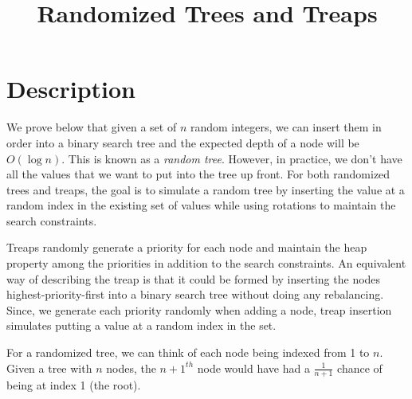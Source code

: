 \documentclass[12pt]{article}
\begin{document}
\title{Randomized Trees and Treaps}
\author{}
\maketitle


\section*{Description}
We prove below that given a set of $n$ random integers, we can insert them in order into a binary search tree and the expected depth of a node will be $O(\log n)$. This is known as a \emph{random tree}. However, in practice, we don't have all the values that we want to put into the tree up front. For both randomized trees and treaps, the goal is to simulate a random tree by inserting the value at a random index in the existing set of values while using rotations to maintain the search constraints.

Treaps randomly generate a priority for each node and maintain the heap property among the priorities in addition to the search constraints. An equivalent way of describing the treap is that it could be formed by inserting the nodes highest-priority-first into a binary search tree without doing any rebalancing. Since, we generate each priority randomly when adding a node, treap insertion simulates putting a value at a random index in the set.

For a randomized tree, we can think of each node being indexed from 1 to $n$. Given a tree with $n$ nodes, the $n+1^{th}$ node would have had a $\frac{1}{n+1}$ chance of being at index 1 (the root).
\end{document}
